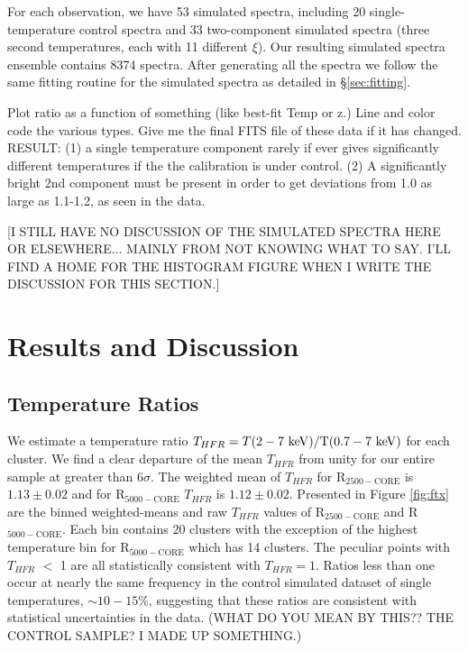 \documentclass{emulateapj}
\newcommand{\tf}{T_{HFR} }
\begin{document}
{For each observation, we have 53 simulated spectra, including 20 single-temperature
control spectra and 33 two-component simulated spectra (three second
temperatures, each with 11 different $\xi$). Our resulting simulated
spectra ensemble contains 8374 spectra. After generating all the
spectra we follow the same fitting routine for the simulated spectra 
as detailed in
\S\ref{sec:fitting}.

Plot ratio as a function of something (like best-fit Temp or z.) 
Line  and color code the various types.
Give me the final FITS file of these data if it has changed.
RESULT:  (1) a single temperature component rarely if ever gives significantly
different temperatures if the the calibration is under control.
(2) A significantly bright 2nd component must be present in order to get deviations
from 1.0 as large as 1.1-1.2, as seen in the data.

[I STILL HAVE NO DISCUSSION OF THE SIMULATED SPECTRA HERE OR
ELSEWHERE... MAINLY FROM NOT KNOWING WHAT TO SAY. I'LL FIND A HOME FOR
THE HISTOGRAM FIGURE WHEN I WRITE THE DISCUSSION FOR THIS SECTION.]

\section{Results and Discussion} \label{sec:r&d}

\subsection{Temperature Ratios} \label{sec:tspecresults}

We estimate a temperature ratio $\tf = T(2-7~\rm{keV})/ T(0.7-7~\rm{keV})$ 
for each cluster.
We find a clear departure of the mean
$\tf$ from unity for our entire sample 
at greater than $6\sigma$. The weighted mean of
$\tf$ for R$_{2500-\text{CORE}}$ is $1.13\pm 0.02$ and for
R$_{5000-\text{CORE}}$ $\tf$ is $1.12\pm 0.02$. Presented in Figure
\ref{fig:ftx} are the binned weighted-means and raw $\tf$ values of
R$_{2500-\text{CORE}}$ and R$_{5000-\text{CORE}}$. Each bin contains
20 clusters with the exception of the highest temperature bin for
R$_{5000-\text{CORE}}$ which has 14 clusters. The peculiar points
with $\tf$ $<$ 1 are all statistically consistent with  $\tf = 1$.
Ratios less than one occur at nearly the same frequency in the
control simulated dataset of single temperatures, $\sim 10-15\%$, 
suggesting that these ratios are consistent with statistical uncertainties 
in the data. (WHAT DO YOU MEAN BY THIS?? THE CONTROL SAMPLE? 
I MADE UP SOMETHING.)

}
\end{document}
